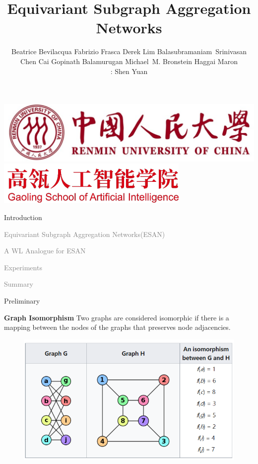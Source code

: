 \documentclass[aspectratio=169,mathserif]{beamer}  %
\title[12.23Pre]{\huge{\textbf{Equivariant Subgraph Aggregation Networks}}}
\author{Beatrice Bevilacqua \quad Fabrizio Frasca \quad Derek Lim \quad Balasubramaniam~Srinivasan \quad Chen Cai \quad Gopinath Balamurugan \quad Michael~M. Bronstein \quad Haggai Maron\\
\tb{presenter}: Shen Yuan
}
\date{}
\newcommand{\light}[1]{\textcolor{gray}{#1}}
\newcommand{\tb}{\textbf}
\begin{document}
 


\begin{frame}
  \titlepage
  \vspace{-1cm}
  \centering
  \includegraphics[width=0.4\linewidth]{ruc_logo.png}\quad
  \includegraphics[width=0.4\linewidth]{GSAI_logo.png}
\end{frame}



\begin{frame}[noframenumbering]
\begin{itemize}
    \begin{LARGE}
    \item Introduction
    \item \light{Equivariant Subgraph Aggregation Networks(ESAN)}
    \item \light{A WL Analogue for ESAN}
    \item \light{Experiments}
    \item \light{Summary}
    \end{LARGE}
\end{itemize}
\end{frame}



\begin{frame}{Preliminary}

\tb{Graph Isomorphism} Two graphs are considered isomorphic if there is a mapping between the nodes of the graphs that preserves node adjacencies.

\begin{figure}[t]
\centerline{\includegraphics[width=0.7\linewidth]{figure5.png}}
\end{figure}

\end{frame}
\end{document}
